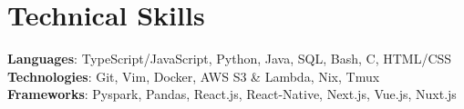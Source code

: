 \section{Technical Skills}
\begin{itemize}[leftmargin=0.15in, label={}]
	\small{\item{
	      \textbf{Languages}{: TypeScript/JavaScript, Python, Java, SQL, Bash, C, HTML/CSS } \\
        \textbf{Technologies}{: Git, Vim, Docker, AWS S3 \& Lambda, Nix, Tmux } \\
        \textbf{Frameworks}{: Pyspark, Pandas, React.js, React-Native, Next.js, Vue.js, Nuxt.js}}}
\end{itemize}
